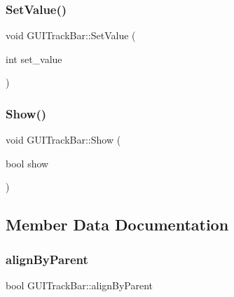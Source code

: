 \hypertarget{class_g_u_i_track_bar_a85603f16317c4b7ba6c37e4bdbf3bc38}{}\label{class_g_u_i_track_bar_a85603f16317c4b7ba6c37e4bdbf3bc38} 
\subsubsection{\texorpdfstring{Set\+Value()}{SetValue()}}
{\footnotesize\ttfamily void G\+U\+I\+Track\+Bar\+::\+Set\+Value (\begin{DoxyParamCaption}\item[{int}]{set\+\_\+value }\end{DoxyParamCaption})}

\hypertarget{class_g_u_i_track_bar_ab1ca3c29142944b50ba8f075f781817b}{}\label{class_g_u_i_track_bar_ab1ca3c29142944b50ba8f075f781817b} 
\subsubsection{\texorpdfstring{Show()}{Show()}}
{\footnotesize\ttfamily void G\+U\+I\+Track\+Bar\+::\+Show (\begin{DoxyParamCaption}\item[{bool}]{show }\end{DoxyParamCaption})}



\subsection{Member Data Documentation}
\hypertarget{class_g_u_i_track_bar_abd8ba11cf2b94ebb6df1d6ad9eae6891}{}\label{class_g_u_i_track_bar_abd8ba11cf2b94ebb6df1d6ad9eae6891} 
\subsubsection{\texorpdfstring{align\+By\+Parent}{alignByParent}}
{\footnotesize\ttfamily bool G\+U\+I\+Track\+Bar\+::align\+By\+Parent}

\hypertarget{class_g_u_i_track_bar_aff7de6859ddc922912fb9b6fc82af73b}{}\label{class_g_u_i_track_bar_aff7de6859ddc922912fb9b6fc82af73b} 
